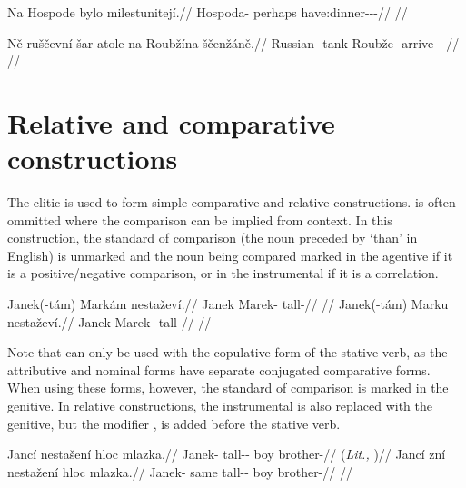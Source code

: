 \pex
\begingl
  \gla Na Hospode bylo milestunitejí.//
  \glb \Loc{} Hospoda-\Acc{} perhaps have:dinner-\Lv{}-\SupP{}-\Quot{}//
  \glft {}//
\endgl
\xe

\pex
\begingl
  \gla Ně ruščevní šar atole na Roubžína ščenžáně.//
  \glb \Pl{} Russian-\Att{} tank \Infer{} \Loc{} Roubže-\Acc{} arrive-\Av{}-\Ret{}-\Quot{}//
  \glft {}//
\endgl
\xe

\section{Relative and comparative
constructions}\label{relativecomparative}

The clitic  is used to form simple comparative and
relative constructions.  is often ommitted where the comparison can be
implied from context. In this construction, the standard of
comparison (the noun preceded by `than' in
English) is unmarked and the noun being compared marked in the
agentive if it is a positive/negative comparison, or in the
instrumental if it is a correlation.

\pex
\a\begingl
\gla Janek(-tám) Markám nestaževí.//
\glb Janek Marek-\Agt{} tall-\Cont{}//
\glft {}//
\endgl
\a\begingl
\gla Janek(-tám) Marku nestaževí.//
\glb Janek Marek-\Ins{} tall-\Cont{}//
\glft {}//
\endgl
\xe

Note that  can only be used with the copulative form of the stative
verb, as the attributive and nominal forms have separate
conjugated comparative forms. When using these forms, however, the standard of
comparison is marked in the genitive. In relative
constructions, the instrumental is also replaced with
the genitive, but the modifier ,  is
added before the stative verb.

\pex
\a
\begingl
\gla Jancí nestašení hloc mlazka.//
\glb Janek-\Gen{} tall-\Comp{}-\Att{} boy brother-\Dim{}//
\glft {} (\emph{Lit.,} )//
\endgl
\a
\begingl
\gla Jancí zní nestažení hloc mlazka.//
\glb Janek-\Gen{} same tall-\Comp{}-\Att{} boy brother-\Dim{}//
\glft {}//
\endgl
\xe

